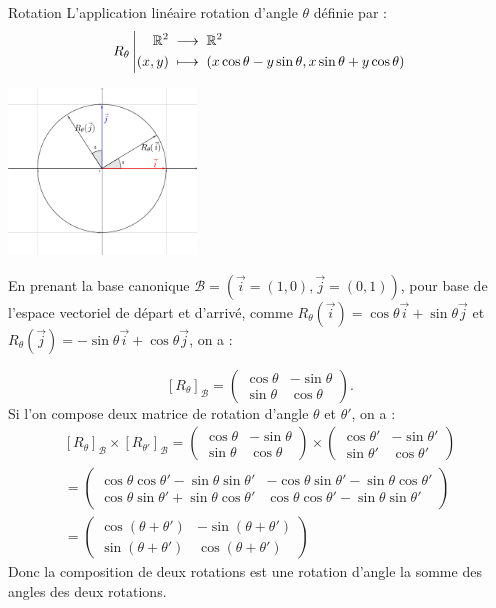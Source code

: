 \documentclass{book}
\begin{document}
\begin{Exemple}{Rotation}
L'application linéaire rotation d'angle $\theta$ définie par :$${R_\theta}\left|\begin{aligned}{\mathbb {R}^2 }&\;\longrightarrow\;{\mathbb {R}^2}\\{(x,y)}&\;\longmapsto\;{ (x\cos \theta - y \sin \theta,x\sin \theta + y \cos \theta)}\end{aligned}\right.$$
\begin{center}
\includegraphics[width=5cm]{rotation.png}
\end{center}
En prenant la base canonique $\mathcal{B}=(\vec{i}=(1,0),\vec{j}=(0,1))$, pour base de l'espace vectoriel de départ et d'arrivé, comme $R_\theta(\vec{i})=\cos \theta \vec{i} + \sin \theta \vec{j}$ et $R_\theta(\vec{j})=-\sin \theta\vec{i}+ \cos \theta\vec{j}$, on a :

$$ [R_\theta]_\mathcal{B}=\begin{pmatrix}\cos \theta &-\sin \theta \\\sin \theta &\cos \theta\end{pmatrix}.$$
Si l'on compose deux matrice de rotation d'angle $\theta$ et $\theta'$, on a :
$$\begin{aligned}
[R_\theta]_\mathcal{B}\times[R_{\theta'}]_\mathcal{B}=\begin{pmatrix}\cos \theta &-\sin \theta \\\sin \theta &\cos \theta\end{pmatrix}\times \begin{pmatrix}\cos \theta' &-\sin \theta' \\\sin \theta' &\cos \theta'\end{pmatrix}\\
=\begin{pmatrix}\cos \theta\cos\theta'-\sin \theta\sin\theta'  &-\cos \theta\sin\theta'-\sin \theta\cos\theta' \\
\cos \theta\sin\theta'+\sin \theta\cos\theta'&\cos \theta\cos\theta'-\sin \theta\sin\theta' 
\end{pmatrix}\\
=\begin{pmatrix}\cos( \theta+\theta') &-\sin( \theta+\theta') \\\sin( \theta+\theta') &\cos( \theta+\theta')\end{pmatrix}
\end{aligned}$$ 
Donc la composition de deux rotations est une rotation d'angle la somme des angles des deux rotations.
\end{Exemple}
\end{document}
